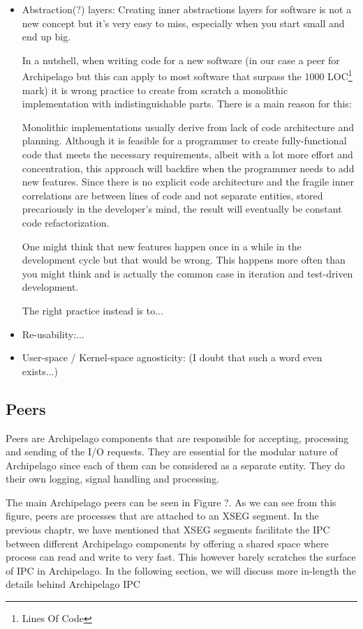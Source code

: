 \begin{itemize}
	\item Abstraction(?) layers: Creating inner abstractions layers for 
		software is not a new concept but it's very easy to miss, 
		especially when you start small and end up big.
		
		In a nutshell, when writing code for a new software (in our case 
		a peer for Archipelago but this can apply to most software that 
		surpass the 1000 LOC\footnote[1]
		{Lines Of Code}
		mark) it is wrong practice to create from scratch a monolithic 
		implementation with indistinguishable parts. There is a main 
		reason for this:
		
		Monolithic implementations usually derive from lack of code 
		architecture and planning. Although it is feasible for a 
		programmer to create fully-functional code that meets the 
		necessary requirements, albeit with a lot more effort and 
		concentration, this approach will backfire when the programmer 
		needs to add new features. Since there is no explicit code 
		architecture and the fragile inner correlations are between 
		lines of code and not separate entities, stored precariously in 
		the developer's mind, the result will eventually be constant 
		code refactorization.
		
		One might think that new features happen once in a while in the 
		development cycle but that would be wrong.  This happens more 
		often than you might think and is actually the common case in 
		iteration and test-driven development.

		The right practice instead is to...
	\item Re-usability:...
	\item User-space / Kernel-space agnosticity: (I doubt that such a word 
		even exists...)
\end{itemize}	

\subsection{Peers}\label{sec:arch-peer}

Peers are Archipelago components that are responsible for accepting, processing 
and sending of the I/O requests. They are essential for the modular nature of 
Archipelago since each of them can be considered as a separate entity. They do 
their own logging, signal handling and processing.

The main Archipelago peers can be seen in Figure ?. As we can see from this 
figure, peers are processes that are attached to an XSEG segment. In the 
previous chaptr, we have mentioned that XSEG segments facilitate the IPC between 
different Archipelago components by offering a shared space where process can 
read and write to very fast. This however barely scratches the surface of IPC in 
Archipelago. In the following section, we will discuss more in-length the 
details behind Archipelago IPC

